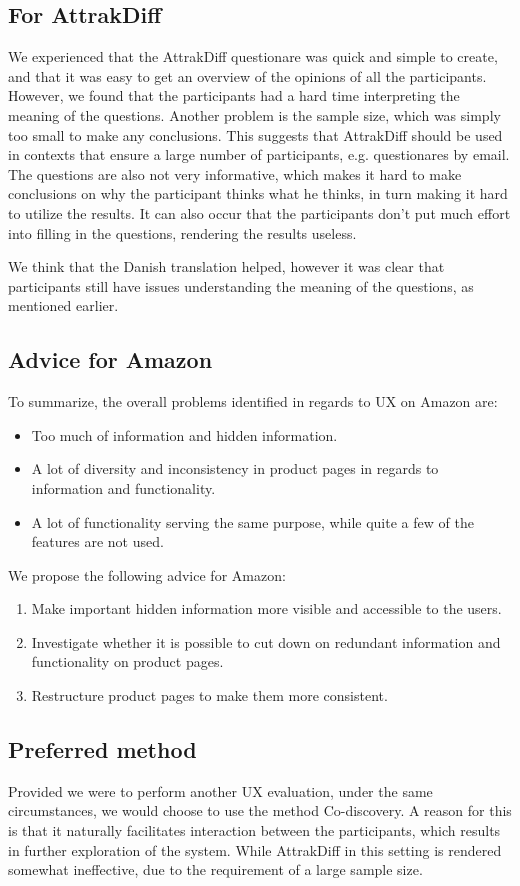 \subsection{For AttrakDiff}
We experienced that the AttrakDiff questionare was quick and simple to create, and that it was easy to get an overview of the opinions of all the participants. However, we found that the participants had a hard time interpreting the meaning of the questions. Another problem is the sample size, which was simply too small to make any conclusions. This suggests that AttrakDiff should be used in contexts that ensure a large number of participants, e.g. questionares by email. The questions are also not very informative, which makes it hard to make conclusions on why the participant thinks what he thinks, in turn making it hard to utilize the results. It can also occur that the participants don't put much effort into filling in the questions, rendering the results useless.

We think that the Danish translation helped, however it was clear that participants still have issues understanding the meaning of the questions, as mentioned earlier.

\subsection{Advice for Amazon}
To summarize, the overall problems identified in regards to UX on Amazon are:
\begin{itemize}
	\item Too much of information and hidden information.
	\item A lot of diversity and inconsistency in product pages in regards to information and functionality.
	\item A lot of functionality serving the same purpose, while quite a few of the features are not used. 
\end{itemize}

We propose the following advice for Amazon:

\begin{enumerate}
\item Make important hidden information more visible and accessible to the users.
\item Investigate whether it is possible to cut down on redundant information and functionality on product pages.
\item Restructure product pages to make them more consistent.
\end{enumerate}

\subsection{Preferred method}
Provided we were to perform another UX evaluation, under the same circumstances, we would choose to use the method Co-discovery. A reason for this is that it naturally facilitates interaction between the participants, which results in further exploration of the system. While AttrakDiff in this setting is rendered somewhat ineffective, due to the requirement of a large sample size.
